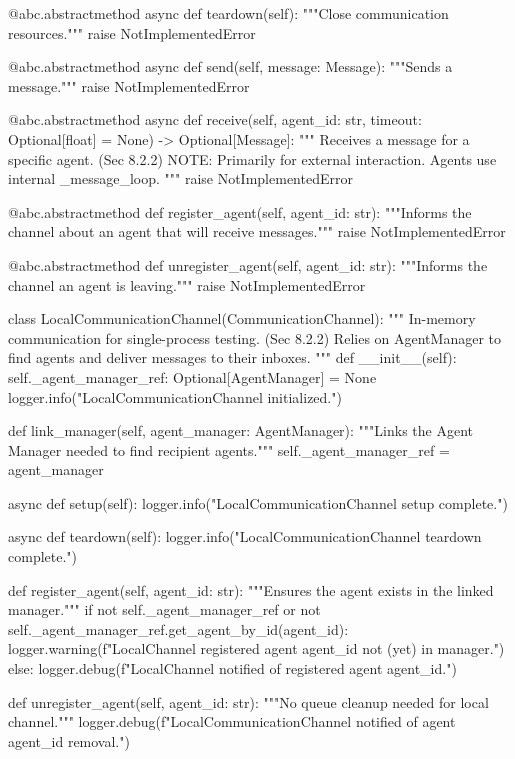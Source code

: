 \documentclass{amsbook}
\theoremstyle{definition}
\theoremstyle{remark}
\numberwithin{equation}{chapter} %
\begin{document}
\begin{python}
    @abc.abstractmethod
    async def teardown(self):
        """Close communication resources."""
        raise NotImplementedError

    @abc.abstractmethod
    async def send(self, message: Message):
        """Sends a message."""
        raise NotImplementedError

    @abc.abstractmethod
    async def receive(self, agent_id: str, timeout: Optional[float] = None) -> Optional[Message]:
        """
        Receives a message for a specific agent. (Sec 8.2.2)
        NOTE: Primarily for external interaction. Agents use internal _message_loop.
        """
        raise NotImplementedError

    @abc.abstractmethod
    def register_agent(self, agent_id: str):
        """Informs the channel about an agent that will receive messages."""
        raise NotImplementedError

    @abc.abstractmethod
    def unregister_agent(self, agent_id: str):
        """Informs the channel an agent is leaving."""
        raise NotImplementedError


class LocalCommunicationChannel(CommunicationChannel):
    """
    In-memory communication for single-process testing. (Sec 8.2.2)
    Relies on AgentManager to find agents and deliver messages to their inboxes.
    """
    def __init__(self):
        self._agent_manager_ref: Optional[AgentManager] = None
        logger.info("LocalCommunicationChannel initialized.")

    def link_manager(self, agent_manager: AgentManager):
         """Links the Agent Manager needed to find recipient agents."""
         self._agent_manager_ref = agent_manager

    async def setup(self):
        logger.info("LocalCommunicationChannel setup complete.")

    async def teardown(self):
        logger.info("LocalCommunicationChannel teardown complete.")

    def register_agent(self, agent_id: str):
        """Ensures the agent exists in the linked manager."""
        if not self._agent_manager_ref or not self._agent_manager_ref.get_agent_by_id(agent_id):
             logger.warning(f"LocalChannel registered agent {agent_id} not (yet) in manager.")
        else:
             logger.debug(f"LocalChannel notified of registered agent {agent_id}.")


    def unregister_agent(self, agent_id: str):
        """No queue cleanup needed for local channel."""
        logger.debug(f"LocalCommunicationChannel notified of agent {agent_id} removal.")


\end{python}
\end{document}
